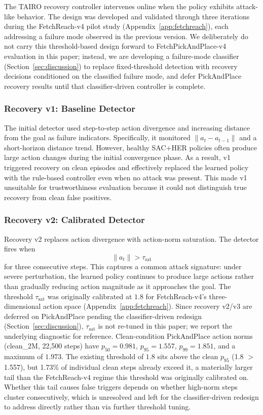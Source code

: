 \documentclass[conference]{IEEEtran}
\begin{document}
The TAIRO recovery controller intervenes online when the policy exhibits attack-like
behavior. The design was developed and validated through three iterations during the
FetchReach-v4 pilot study (Appendix~\ref{app:fetchreach}), each addressing a failure
mode observed in the previous version. We deliberately do not carry this
threshold-based design forward to FetchPickAndPlace-v4 evaluation in this paper;
instead, we are developing a failure-mode classifier (Section~\ref{sec:discussion}) to
replace fixed-threshold detection with recovery decisions conditioned on the
classified failure mode, and defer PickAndPlace recovery results until that
classifier-driven controller is complete.

\subsubsection{Recovery v1: Baseline Detector}

The initial detector used step-to-step action divergence and increasing distance from
the goal as failure indicators. Specifically, it monitored
$\lVert a_t-a_{t-1}\rVert$ and a short-horizon distance trend. However, healthy
SAC+HER policies often produce large action changes during the initial convergence
phase. As a result, v1 triggered recovery on clean episodes and effectively replaced
the learned policy with the rule-based controller even when no attack was present. This
made v1 unsuitable for trustworthiness evaluation because it could not distinguish
true recovery from clean false positives.

\subsubsection{Recovery v2: Calibrated Detector}

Recovery v2 replaces action divergence with action-norm saturation. The detector fires
when
\[
\lVert a_t\rVert > \tau_{\mathrm{sat}}
\]
for three consecutive steps. This captures a common attack signature: under severe
perturbation, the learned policy continues to produce large actions rather than
gradually reducing action magnitude as it approaches the goal. The threshold
$\tau_{\mathrm{sat}}$ was originally calibrated at $1.8$ for FetchReach-v4's
three-dimensional action space (Appendix~\ref{app:fetchreach}). Since recovery v2/v3
are deferred on PickAndPlace pending the classifier-driven redesign
(Section~\ref{sec:discussion}), $\tau_{\mathrm{sat}}$ is not re-tuned in this paper;
we report the underlying diagnostic for reference. Clean-condition PickAndPlace action
norms (clean\_2M, 22{,}500 steps) have $p_{50}=0.981$, $p_{95}=1.557$, $p_{99}=1.851$,
and a maximum of $1.973$. The existing threshold of $1.8$ sits above the clean $p_{95}$
(1.8 $>$ 1.557), but 1.73\% of individual clean steps already exceed it, a materially
larger tail than the FetchReach-v4 regime this threshold was originally calibrated on.
Whether this tail causes false triggers depends on whether high-norm steps cluster
consecutively, which is unresolved and left for the classifier-driven redesign to
address directly rather than via further threshold tuning.
\end{document}

